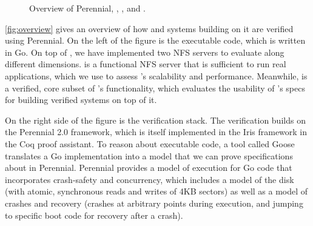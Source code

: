 
\begin{figure}

\caption{Overview of Perennial, \txn, \simplenfs, and \gnfs.}
\label{fig:overview}
\end{figure}



\autoref{fig:overview} gives an overview of how \txn and systems
building on it are verified using Perennial.
On the left of the figure is the executable code, which is written
in Go. On top of \txn, we have implemented two NFS servers to evaluate \txn
along different dimensions. \gnfs is a functional NFS server that is sufficient
to run real applications, which we use to assess \txn's scalability and
performance. Meanwhile, \simplenfs is a verified, core subset of \gnfs's
functionality, which evaluates the usability of \txn's specs for building
verified systems on top of it.

On the right side of the figure is the verification stack. The verification
builds on the Perennial 2.0 framework, which is itself implemented in the Iris
framework in the Coq proof assistant. To reason about executable code, a tool
called Goose translates a Go implementation into a model that we can prove
specifications about in Perennial. Perennial provides a model of execution for
Go code that incorporates crash-safety and concurrency, which
includes a model of the disk (with atomic, synchronous reads and writes of 4KB
sectors) as well as a model of crashes and recovery (crashes at arbitrary points
during execution, and jumping to specific boot code for recovery after a crash).

